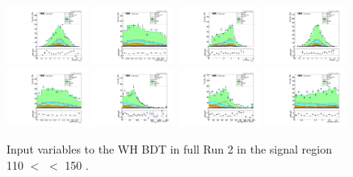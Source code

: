 \begin{figure}[!htb]
  \includegraphics[width=0.24\textwidth]{pics/VH_sec/valid_BDT_WH/lep_muSS_dEta.pdf}
  \includegraphics[width=0.24\textwidth]{pics/VH_sec/valid_BDT_WH/lep_muSS_cosThStar.pdf}
  \includegraphics[width=0.24\textwidth]{pics/VH_sec/valid_BDT_WH/lep_muOS_dR.pdf}
  \includegraphics[width=0.24\textwidth]{pics/VH_sec/valid_BDT_WH/lep_muOS_dEta.pdf}
  \includegraphics[width=0.24\textwidth]{pics/VH_sec/valid_BDT_WH/lep_muOS_cosThStar.pdf}
  \includegraphics[width=0.24\textwidth]{pics/VH_sec/valid_BDT_WH/muSS_MHT_MT.pdf}
  \includegraphics[width=0.24\textwidth]{pics/VH_sec/valid_BDT_WH/lep_MHT_MT.pdf}
  \includegraphics[width=0.24\textwidth]{pics/VH_sec/valid_BDT_WH/lep_MHT_dPhi_abs.pdf}
  \caption{Input variables to the WH BDT in full Run 2 in the signal region 110 \GeV $<$ \mmm $<$ 150 \GeV.}
  \label{fig:wh_bdt_inputs_data}
\end{figure}

